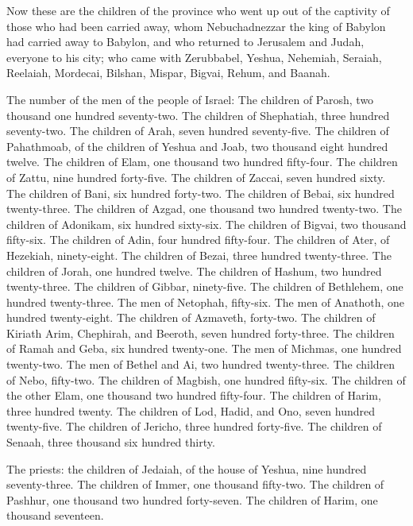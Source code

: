 \mychapter{} \myverse*{}Now these are the children of the province who went up out of the
captivity of those who had been carried away, whom Nebuchadnezzar the king of Babylon had carried away
to Babylon, and who returned to Jerusalem and Judah, everyone to his city;
\myverse{}who came with Zerubbabel, Yeshua, Nehemiah, Seraiah, Reelaiah, Mordecai, Bilshan,
Mispar, Bigvai, Rehum, and Baanah.

The number of the men of the people of Israel:
\myverse{}The children of Parosh, two thousand one hundred seventy-two.
\myverse{}The children of Shephatiah, three hundred seventy-two.
\myverse{}The children of Arah, seven hundred seventy-five.
\myverse{}The children of Pahathmoab, of the children of Yeshua and Joab, two thousand
eight hundred twelve.
\myverse{}The children of Elam, one thousand two hundred fifty-four.
\myverse{}The children of Zattu, nine hundred forty-five.
\myverse{}The children of Zaccai, seven hundred sixty.
\myverse{}The children of Bani, six hundred forty-two.
\myverse{}The children of Bebai, six hundred twenty-three.
\myverse{}The children of Azgad, one thousand two hundred twenty-two.
\myverse{}The children of Adonikam, six hundred sixty-six.
\myverse{}The children of Bigvai, two thousand fifty-six.
\myverse{}The children of Adin, four hundred fifty-four.
\myverse{}The children of Ater, of Hezekiah, ninety-eight.
\myverse{}The children of Bezai, three hundred twenty-three.
\myverse{}The children of Jorah, one hundred twelve.
\myverse{}The children of Hashum, two hundred twenty-three.
\myverse{}The children of Gibbar, ninety-five.
\myverse{}The children of Bethlehem, one hundred twenty-three.
\myverse{}The men of Netophah, fifty-six.
\myverse{}The men of Anathoth, one hundred twenty-eight.
\myverse{}The children of Azmaveth, forty-two.
\myverse{}The children of Kiriath Arim, Chephirah, and Beeroth, seven hundred forty-three.
\myverse{}The children of Ramah and Geba, six hundred twenty-one.
\myverse{}The men of Michmas, one hundred twenty-two.
\myverse{}The men of Bethel and Ai, two hundred twenty-three.
\myverse{}The children of Nebo, fifty-two.
\myverse{}The children of Magbish, one hundred fifty-six.
\myverse{}The children of the other Elam, one thousand two hundred fifty-four.
\myverse{}The children of Harim, three hundred twenty.
\myverse{}The children of Lod, Hadid, and Ono, seven hundred twenty-five.
\myverse{}The children of Jericho, three hundred forty-five.
\myverse{}The children of Senaah, three thousand six hundred thirty.

\myverse{}The priests: the children of Jedaiah, of the house of Yeshua,
nine hundred seventy-three.
\myverse{}The children of Immer, one thousand fifty-two.
\myverse{}The children of Pashhur, one thousand two hundred forty-seven.
\myverse{}The children of Harim, one thousand seventeen.

